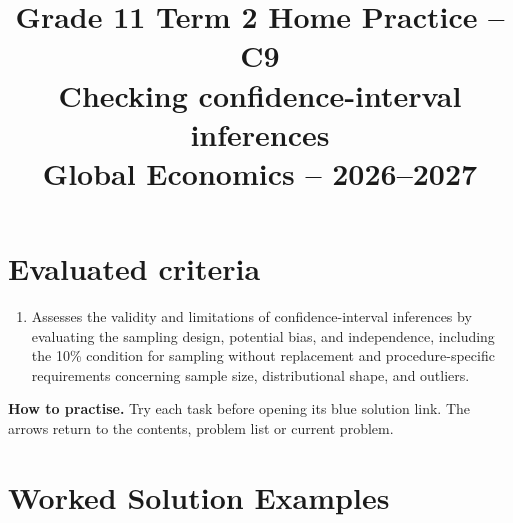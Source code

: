 \makeatletter
{}
\makeatother


\usepackage{needspace}
\usepackage{titling}
\setlength{\droptitle}{-2em}
\pretitle{\par\begingroup\centering\LARGE}
\posttitle{\par\endgroup}
\preauthor{}\postauthor{}
\predate{}\postdate{}
\maketitlehookd{\vspace{-1em}}
\linespread{1.12}
\setlength{\parskip}{5pt}

\title{Grade 11 Term 2 Home Practice -- C9\\\large Checking confidence-interval inferences\\[0.25em]
	\normalsize Global Economics -- 2026--2027}
\author{}
\date{}


	\maketitle

	\setcounter{tocdepth}{1}
	\setcounter{secnumdepth}{2}
	\label{toc}
	\tableofcontents

	\section*{Evaluated criteria}
	\begin{enumerate}[label=\textbf{C\arabic*},start=9]
		\item Assesses the validity and limitations of confidence-interval inferences by evaluating the sampling design, potential bias, and independence, including the 10\% condition for sampling without replacement and procedure-specific requirements concerning sample size, distributional shape, and outliers.
	\end{enumerate}

	\textbf{How to practise.} Try each task before opening its blue solution link. The arrows return to the contents, problem list or current problem.

	\section{Worked Solution Examples}
	\label{sec:worked-solution-examples}


